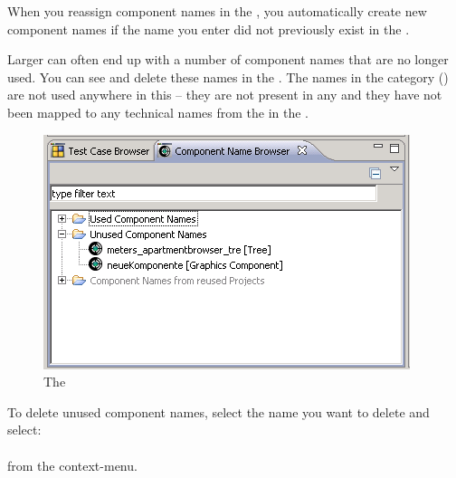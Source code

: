 
When you reassign component names in the \gdcompnamesview{}, you automatically create new component names if the name you enter did not previously exist in the \gdproject{}. 

Larger \gdprojects{} can often end up with a number of component names that are no longer used. You can see and delete these names in the \gdcompnamebrowser{}. 
The names in the  category  () are not used anywhere in this \gdproject{} -- they are not present in any \gdcases{} and they have not been mapped to any technical names from the \gdaut{} in the \gdomeditor{}.

\begin{figure}[h]
\begin{center}
\includegraphics{Tasks/Compnames/PS/compnamebrowser}
\caption{The \gdcompnamebrowser{}}
\label{compnamebrowser}
\end{center}
\end{figure} 

To delete unused component names, select the name you want to delete and select:\\
\\
from the context-menu. 

